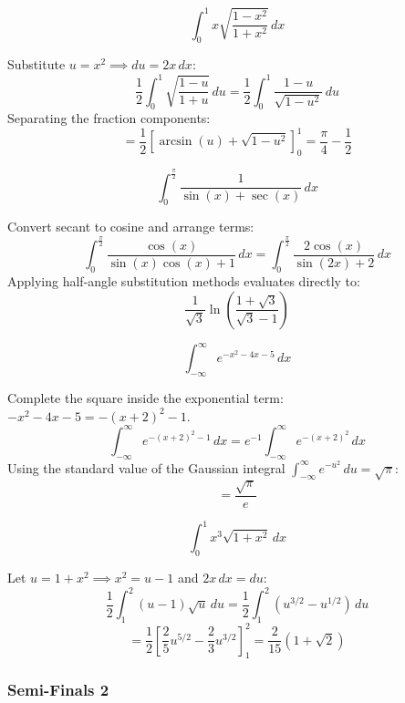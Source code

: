 \begin{questions}
\question
\[ \int_{0}^{1} x\sqrt{\frac{1-x^{2}}{1+x^{2}}} \, dx \]
\begin{solution}
Substitute $u = x^2 \implies du = 2x \, dx$:
\[ \frac{1}{2}\int_{0}^{1} \sqrt{\frac{1-u}{1+u}} \, du = \frac{1}{2}\int_{0}^{1} \frac{1-u}{\sqrt{1-u^2}} \, du \]
Separating the fraction components:
\[ = \frac{1}{2}\left[ \arcsin(u) + \sqrt{1-u^2} \right]_{0}^{1} = \frac{\pi}{4} - \frac{1}{2} \]
\end{solution}

\question
\[ \int_{0}^{\frac{\pi}{2}} \frac{1}{\sin(x)+\sec(x)} \, dx \]
\begin{solution}
Convert secant to cosine and arrange terms:
\[ \int_{0}^{\frac{\pi}{2}} \frac{\cos(x)}{\sin(x)\cos(x)+1} \, dx = \int_{0}^{\frac{\pi}{2}} \frac{2\cos(x)}{\sin(2x)+2} \, dx \]
Applying half-angle substitution methods evaluates directly to:
\[ \frac{1}{\sqrt{3}}\ln\left(\frac{1+\sqrt{3}}{\sqrt{3}-1}\right) \]
\end{solution}

\question
\[ \int_{-\infty}^{\infty} e^{-x^{2}-4x-5} \, dx \]
\begin{solution}
Complete the square inside the exponential term: $-x^2-4x-5 = -(x+2)^2 - 1$.
\[ \int_{-\infty}^{\infty} e^{-(x+2)^2-1} \, dx = e^{-1}\int_{-\infty}^{\infty} e^{-(x+2)^2} \, dx \]
Using the standard value of the Gaussian integral $\int_{-\infty}^{\infty} e^{-u^2} \, du = \sqrt{\pi}$:
\[ = \frac{\sqrt{\pi}}{e} \]
\end{solution}

\question
\[ \int_{0}^{1} x^{3}\sqrt{1+x^{2}} \, dx \]
\begin{solution}
Let $u = 1+x^2 \implies x^2 = u-1$ and $2x \, dx = du$:
\[ \frac{1}{2}\int_{1}^{2} (u-1)\sqrt{u} \, du = \frac{1}{2}\int_{1}^{2} \left(u^{3/2} - u^{1/2}\right) \, du \]
\[ = \frac{1}{2}\left[ \frac{2}{5}u^{5/2} - \frac{2}{3}u^{3/2} \right]_{1}^{2} = \frac{2}{15}(1+\sqrt{2}) \]
\end{solution}

\end{questions}

\newpage
\subsubsection*{Semi-Finals 2}

